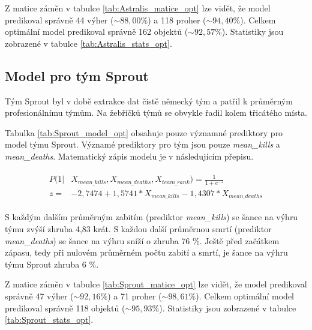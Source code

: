 



Z matice záměn v tabulce \ref{tab:Astralis_matice_opt} lze vidět, že model predikoval správně 44 výher ($\sim 88,00 \%$) a 118 proher ($\sim 94,40 \%$).
Celkem optimální model predikoval správně 162 objektů ($\sim 92,57 \%$). Statistiky jsou zobrazené v tabulce \ref{tab:Astralis_stats_opt}.

\subsection{Model pro tým Sprout}
Tým Sprout byl v době extrakce dat čistě německý tým a patřil k průměrným profesionálnímu týmům. Na žebříčků týmů se obvykle řadil kolem třicátého místa.



Tabulka \ref{tab:Sprout_model_opt} obsahuje pouze významné prediktory pro model týmu Sprout. Významé prediktory pro tým jsou pouze \textit{mean\_kills} a \textit{mean\_deaths}.
Matematický zápis modelu je v následujícím přepisu.

\begin{align}
    \begin{split}
        P(1 | &X_{mean\_kills}, X_{mean\_deaths}, X_{team\_rank}) = \frac{1}{1 + e^{-z}} \\
        z =   &-2,7474 + 1,5741*X_{mean\_kills} - 1,4307*X_{mean\_deaths}
    \end{split}
\end{align}

S každým dalším průměrným zabitím (prediktor \textit{mean\_kills}) se šance na výhru týmu zvýší zhruba 4,83 krát. S každou další průměrnou smrtí (prediktor \textit{mean\_deaths})
se šance na výhru sníží o zhruba 76 \%. Ještě před začátkem zápasu, tedy při nulovém průměrném počtu zabití a smrtí, je šance na výhru týmu Sprout zhruba 6 \%.





Z matice záměn v tabulce \ref{tab:Sprout_matice_opt} lze vidět, že model predikoval správně 47 výher ($\sim 92,16 \%$) a 71 proher ($\sim 98,61 \%$).
Celkem optimální model predikoval správně 118 objektů ($\sim 95,93 \%$). Statistiky jsou zobrazené v tabulce \ref{tab:Sprout_stats_opt}.


